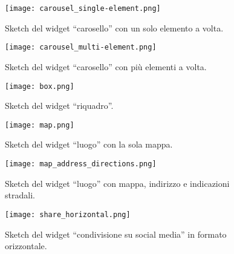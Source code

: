        	\begin{figure}[h!]
       		\begin{center}
       			\texttt{[image: carousel\_single-element.png]}
       		\end{center}
       		\caption[Sketch del widget ``carosello'' (elemento singolo)]{Sketch del widget ``carosello'' con un solo elemento a volta.}
       		\label{fig:carousel_single-element}
       	\end{figure}
        
       	\begin{figure}[h!]
       		\begin{center}
       			\texttt{[image: carousel\_multi-element.png]}
       		\end{center}
       		\caption[Sketch del widget ``carosello'' (elementi multipli)]{Sketch del widget ``carosello'' con più elementi a volta.}
       		\label{fig:carousel_multi-element}
       	\end{figure}
        
       	\begin{figure}[h!]
       		\begin{center}
       			\texttt{[image: box.png]}
       		\end{center}
       		\caption[Sketch del widget ``riquadro'']{Sketch del widget ``riquadro''.}
       		\label{fig:box}
       	\end{figure}
       	
       	\begin{figure}[h!]
       		\begin{center}
       			\texttt{[image: map.png]}
       		\end{center}
       		\caption[Sketch del widget ``luogo'' (semplice)]{Sketch del widget ``luogo'' con la sola mappa.}
       		\label{fig:map}
       	\end{figure}
       	
       	\begin{figure}[h!]
       		\begin{center}
       			\texttt{[image: map\_address\_directions.png]}
       		\end{center}
       		\caption[Sketch del widget ``luogo'' (con indirizzo e indicazioni)]{Sketch del widget ``luogo'' con mappa, indirizzo e indicazioni stradali.}
       		\label{fig:map_address_directions}
       	\end{figure}
       	
       	\begin{figure}[h!]
       		\begin{center}
       			\texttt{[image: share\_horizontal.png]}
       		\end{center}
       		\caption[Sketch del widget ``condivisione su social media'' (orizzontale)]{Sketch del widget ``condivisione su social media'' in formato orizzontale.}
       		\label{fig:share_horizontal}
       	\end{figure}
       	
